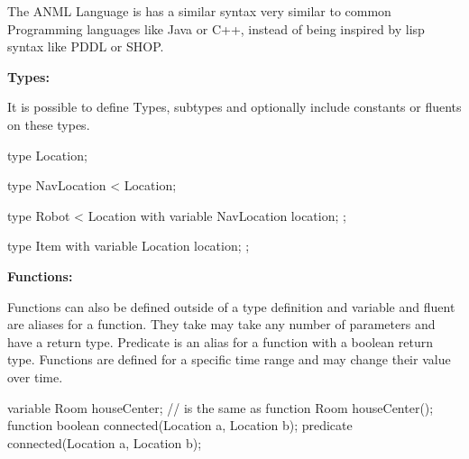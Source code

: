 \lstset{
  language=ANML,
  style=anmlStyle,
}

The ANML Language is has a similar syntax very similar to common Programming languages like Java or C++, instead of being inspired by lisp syntax like PDDL or SHOP.

{\bf Types:}

It is possible to define Types, subtypes and optionally include constants or fluents on these types.








\begin{anmlcode}
type Location;

type NavLocation < Location;

type Robot < Location with {
  variable NavLocation location;
};

type Item with {
  variable Location location;
};
\end{anmlcode}


{\bf Functions:}

Functions can also be defined outside of a type definition and variable and fluent are aliases for a function.
They take may take any number of parameters and have a return type.
Predicate is an alias for a function with a boolean return type.
Functions are defined for a specific time range and may change their value over time.

\begin{anmlcode}
variable Room houseCenter; // is the same as
function Room houseCenter();
function boolean connected(Location a, Location b);
predicate connected(Location a, Location b);
\end{anmlcode}

